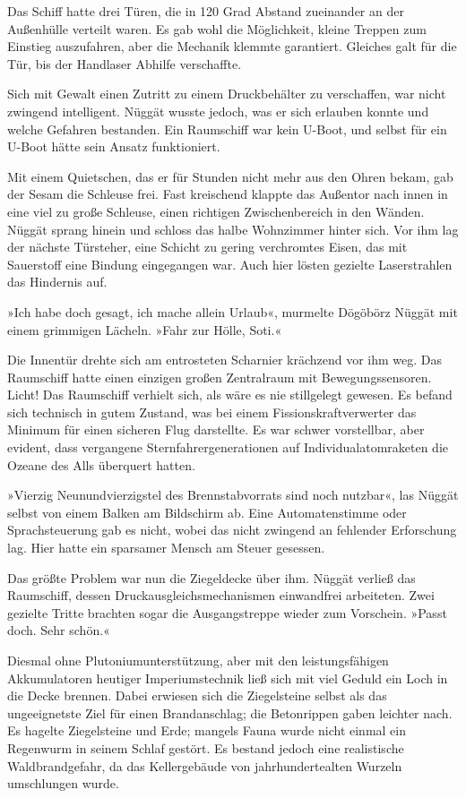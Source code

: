 Das Schiff hatte drei Türen, die in 120 Grad Abstand zueinander an der Außenhülle verteilt waren. Es gab wohl die Möglichkeit, kleine Treppen zum Einstieg auszufahren, aber die Mechanik klemmte garantiert. Gleiches galt für die Tür, bis der Handlaser Abhilfe verschaffte.

Sich mit Gewalt einen Zutritt zu einem Druckbehälter zu verschaffen, war nicht zwingend intelligent. Nüggät wusste jedoch, was er sich erlauben konnte und welche Gefahren bestanden. Ein Raumschiff war kein U-Boot, und selbst für ein U-Boot hätte sein Ansatz funktioniert.

Mit einem Quietschen, das er für Stunden nicht mehr aus den Ohren bekam, gab der Sesam die Schleuse frei. Fast kreischend klappte das Außentor nach innen in eine viel zu große Schleuse, einen richtigen Zwischenbereich in den Wänden. Nüggät sprang hinein und schloss das halbe Wohnzimmer hinter sich. Vor ihm lag der nächste Türsteher, eine Schicht zu gering verchromtes Eisen, das mit Sauerstoff eine Bindung eingegangen war. Auch hier lösten gezielte Laserstrahlen das Hindernis auf.

»Ich habe doch gesagt, ich mache allein Urlaub«, murmelte Dögöbörz Nüggät mit einem grimmigen Lächeln. »Fahr zur Hölle, Soti.«

Die Innentür drehte sich am entrosteten Scharnier krächzend vor ihm weg. Das Raumschiff hatte einen einzigen großen Zentralraum mit Bewegungssensoren. Licht! Das Raumschiff verhielt sich, als wäre es nie stillgelegt gewesen. Es befand sich technisch in gutem Zustand, was bei einem Fissionskraftverwerter das Minimum für einen sicheren Flug darstellte. Es war schwer vorstellbar, aber evident, dass vergangene Sternfahrergenerationen auf Individualatomraketen die Ozeane des Alls überquert hatten.

»Vierzig Neunundvierzigstel des Brennstabvorrats sind noch nutzbar«, las Nüggät selbst von einem Balken am Bildschirm ab. Eine Automatenstimme oder Sprachsteuerung gab es nicht, wobei das nicht zwingend an fehlender Erforschung lag. Hier hatte ein sparsamer Mensch am Steuer gesessen.

Das größte Problem war nun die Ziegeldecke über ihm. Nüggät verließ das Raumschiff, dessen Druckausgleichsmechanismen einwandfrei arbeiteten. Zwei gezielte Tritte brachten sogar die Ausgangstreppe wieder zum Vorschein. »Passt doch. Sehr schön.«

Diesmal ohne Plutoniumunterstützung, aber mit den leistungsfähigen Akkumulatoren heutiger Imperiumstechnik ließ sich mit viel Geduld ein Loch in die Decke brennen. Dabei erwiesen sich die Ziegelsteine selbst als das ungeeignetste Ziel für einen Brandanschlag; die Betonrippen gaben leichter nach. Es hagelte Ziegelsteine und Erde; mangels Fauna wurde nicht einmal ein Regenwurm in seinem Schlaf gestört. Es bestand jedoch eine realistische Waldbrandgefahr, da das Kellergebäude von jahrhundertealten Wurzeln umschlungen wurde.

